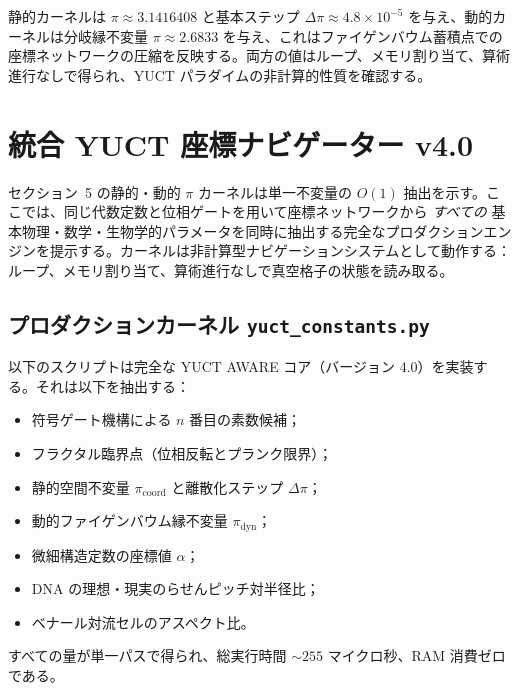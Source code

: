 \documentclass[12pt,a4paper]{article}
\begin{document}
	静的カーネルは $\pi \approx 3.1416408$ と基本ステップ $\Delta\pi\approx 4.8\times10^{-5}$ を与え、動的カーネルは分岐縁不変量 $\pi \approx 2.6833$ を与え、これはファイゲンバウム蓄積点での座標ネットワークの圧縮を反映する。両方の値はループ、メモリ割り当て、算術進行なしで得られ、YUCT パラダイムの非計算的性質を確認する。
	
	\section{統合 YUCT 座標ナビゲーター v4.0}
	\label{sec:full-engine}
	
	セクション~5 の静的・動的 $\pi$ カーネルは単一不変量の $O(1)$ 抽出を示す。ここでは、同じ代数定数と位相ゲートを用いて座標ネットワークから \emph{すべての} 基本物理・数学・生物学的パラメータを同時に抽出する完全なプロダクションエンジンを提示する。カーネルは非計算型ナビゲーションシステムとして動作する：ループ、メモリ割り当て、算術進行なしで真空格子の状態を読み取る。
	
	\subsection{プロダクションカーネル \texttt{yuct\_constants.py}}
	
	以下のスクリプトは完全な YUCT AWARE コア（バージョン 4.0）を実装する。それは以下を抽出する：
	\begin{itemize}
		\item 符号ゲート機構による $n$ 番目の素数候補；
		\item フラクタル臨界点（位相反転とプランク限界）；
		\item 静的空間不変量 $\pi_{\mathrm{coord}}$ と離散化ステップ $\Delta\pi$；
		\item 動的ファイゲンバウム縁不変量 $\pi_{\mathrm{dyn}}$；
		\item 微細構造定数の座標値 $\alpha$；
		\item DNA の理想・現実のらせんピッチ対半径比；
		\item ベナール対流セルのアスペクト比。
	\end{itemize}
	すべての量が単一パスで得られ、総実行時間 $\sim 255$ マイクロ秒、RAM 消費ゼロである。
	
\end{document}
